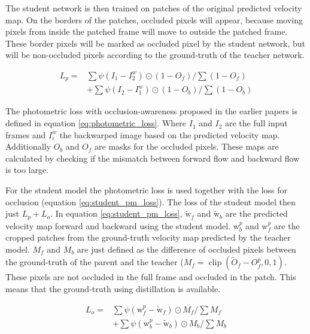 The student network is then trained on patches of the original predicted velocity map. On the borders of the patches, occluded pixels will appear, because moving pixels from inside the patched frame will move to outside the patched frame. These border pixels will be marked as occluded pixel by the student network, but will be non-occluded pixels according to the ground-truth of the teacher network.

\begin{equation}
\begin{aligned}
L_{p}=& \sum \psi\left(I_{1}-I_{2}^{w}\right) \odot\left(1-O_{f}\right) / \sum\left(1-O_{f}\right) \\
&+\sum \psi\left(I_{2}-I_{1}^{w}\right) \odot\left(1-O_{b}\right) / \sum\left(1-O_{b}\right)
\end{aligned}
\label{eq:photometric_loss}
\end{equation}

The photometric loss with occlusion-awareness proposed in the earlier papers is defined in equation \ref{eq:photometric_loss}. Where $I_1$ and $I_2$ are the full input frames and $I_i^w$ the backwarped image based on the predicted velocity map. Additionally $O_b$ and $O_f$ are masks for the occluded pixels. These maps are calculated by checking if the mismatch between forward flow and backward flow is too large.

For the student model the photometric loss is used together with the loss for occlusion (equation \ref{eq:student_pm_loss}). The loss of the student model then just $L_p+L_o$. In equation \ref{eq:student_pm_loss}, $\widetilde{\mathrm{w}}_{f}$ and $\widetilde{\mathrm{w}}_{b}$ are the predicted velocity map forward and backward using the student model. $\mathrm{w}_{b}^{p}$ and $\mathrm{w}_{f}^{p}$ are the cropped patches from the ground-truth velocity map predicted by the teacher model. $M_f$ and $M_b$ are just defined as the difference of occluded pixels between the ground-truth of the parent and the teacher ($M_{f}=\operatorname{clip}\left(\widetilde{O}_{f}-O_{f}^{p}, 0,1\right)$. These pixels are not occluded in the full frame and occluded in the patch. This means that the ground-truth using distillation is available.

\begin{equation}
\begin{aligned}
L_{o}=&\sum \psi\left(\mathrm{w}_{f}^{p}-\widetilde{\mathrm{w}}_{f}\right) \odot M_{f} / \sum M_{f} \\
&+\sum \psi\left(\mathrm{w}_{b}^{p}-\widetilde{\mathrm{w}}_{b}\right) \odot M_{b} / \sum M_{b}
\end{aligned}
\label{eq:student_pm_loss}
\end{equation}

